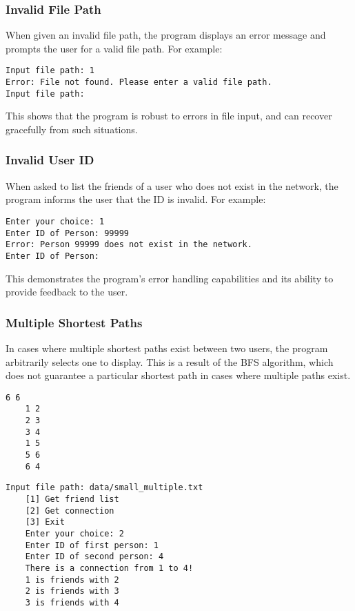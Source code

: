 \subsubsection{Invalid File Path}

When given an invalid file path, the program displays an error message and prompts the user for a valid file path. For example:

\begin{verbatim}
Input file path: 1
Error: File not found. Please enter a valid file path.
Input file path: 
\end{verbatim}

This shows that the program is robust to errors in file input, and can recover gracefully from such situations.

\subsubsection{Invalid User ID}

When asked to list the friends of a user who does not exist in the network, the program informs the user that the ID is invalid. For example:

\begin{verbatim}
Enter your choice: 1
Enter ID of Person: 99999
Error: Person 99999 does not exist in the network.
Enter ID of Person: 
\end{verbatim}

This demonstrates the program's error handling capabilities and its ability to provide feedback to the user.

\subsubsection{Multiple Shortest Paths}

In cases where multiple shortest paths exist between two users, the program arbitrarily selects one to display. This is a result of the BFS algorithm, which does not guarantee a particular shortest path in cases where multiple paths exist.

\begin{lstlisting}[frame=lines,caption=Example of a Dataset with Multiple Paths, label=lst:MultiplePaths]
	6 6
	1 2
	2 3
	3 4
	1 5
	5 6
	6 4
\end{lstlisting}

\begin{lstlisting}[frame=lines,caption=Actual Output, label=lst:ActualOutput]
	Input file path: data/small_multiple.txt
	[1] Get friend list
	[2] Get connection
	[3] Exit
	Enter your choice: 2
	Enter ID of first person: 1
	Enter ID of second person: 4
	There is a connection from 1 to 4!
	1 is friends with 2
	2 is friends with 3
	3 is friends with 4
\end{lstlisting}
